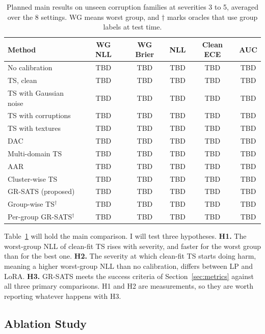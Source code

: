 \documentclass[sigconf,nonacm]{acmart}
\begin{document}
\begin{table}[t]
  \caption{Planned main results on unseen corruption families at severities 3 to 5, averaged over the 8 settings. WG means worst group, and $\dagger$ marks oracles that use group labels at test time.}
  \label{tab:results}
  \scriptsize
  \setlength{\tabcolsep}{3.5pt}
  \begin{tabular}{@{}lccccc@{}}
    \toprule
    \textbf{Method} & \textbf{WG NLL} & \textbf{WG Brier} & \textbf{NLL} & \textbf{Clean ECE} & \textbf{AUC} \\
    \midrule
    No calibration & TBD & TBD & TBD & TBD & TBD \\
    TS, clean & TBD & TBD & TBD & TBD & TBD \\
    TS with Gaussian noise & TBD & TBD & TBD & TBD & TBD \\
    TS with corruptions & TBD & TBD & TBD & TBD & TBD \\
    TS with textures & TBD & TBD & TBD & TBD & TBD \\
    DAC & TBD & TBD & TBD & TBD & TBD \\
    Multi-domain TS & TBD & TBD & TBD & TBD & TBD \\
    AAR & TBD & TBD & TBD & TBD & TBD \\
    Cluster-wise TS & TBD & TBD & TBD & TBD & TBD \\
    GR-SATS (proposed) & TBD & TBD & TBD & TBD & TBD \\
    \midrule
    Group-wise TS$^\dagger$ & TBD & TBD & TBD & TBD & TBD \\
    Per-group GR-SATS$^\dagger$ & TBD & TBD & TBD & TBD & TBD \\
    \bottomrule
  \end{tabular}
\end{table}

Table~\ref{tab:results} will hold the main comparison. I will test three hypotheses. \textbf{H1.} The worst-group NLL of clean-fit TS rises with severity, and faster for the worst group than for the best one. \textbf{H2.} The severity at which clean-fit TS starts doing harm, meaning a higher worst-group NLL than no calibration, differs between LP and LoRA. \textbf{H3.} GR-SATS meets the success criteria of Section~\ref{sec:metrics} against all three primary comparisons. H1 and H2 are measurements, so they are worth reporting whatever happens with H3.

\subsection{Ablation Study}
\end{document}
